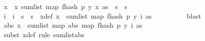 \begin{isabellebody}
\ {\isachardoublequoteopen}x\ {\isasymin}\ {\isacharparenleft}{\kern0pt}{\isasymlambda}x{\isachardot}{\kern0pt}\ sum{\isacharunderscore}{\kern0pt}list\ {\isacharparenleft}{\kern0pt}map\ {\isacharparenleft}{\kern0pt}f{}{\isacharunderscore}{\kern0pt}hash\ p\ {\isacharparenleft}{\kern0pt}y\ x{\isacharparenright}{\kern0pt}{\isacharparenright}{\kern0pt}\ as{\isacharparenright}{\kern0pt}{\isacharparenright}{\kern0pt}\ {\isacharbackquote}{\kern0pt}\ {\isacharparenleft}{\kern0pt}{\isacharbraceleft}{\kern0pt}{}{\isachardot}{\kern0pt}{\isachardot}{\kern0pt}{\isacharless}{\kern0pt}s\ {\isasymtimes}\ {\isacharbraceleft}{\kern0pt}{}{\isachardot}{\kern0pt}{\isachardot}{\kern0pt}{\isacharless}{\kern0pt}s\isanewline
\ \ \ \ \ \ \isamarkupfalse%
\ \isamarkupfalse%
\ i\ \ {\isachardoublequoteopen}i\ {\isasymin}\ {\isacharbraceleft}{\kern0pt}{}{\isachardot}{\kern0pt}{\isachardot}{\kern0pt}{\isacharless}{\kern0pt}s\ {\isasymtimes}\ {\isacharbraceleft}{\kern0pt}{}{\isachardot}{\kern0pt}{\isachardot}{\kern0pt}{\isacharless}{\kern0pt}s\ \ x{\isacharunderscore}{\kern0pt}def{\isacharcolon}{\kern0pt}\ {\isachardoublequoteopen}x\ {\isacharequal}{\kern0pt}\ sum{\isacharunderscore}{\kern0pt}list\ {\isacharparenleft}{\kern0pt}map\ {\isacharparenleft}{\kern0pt}f{}{\isacharunderscore}{\kern0pt}hash\ p\ {\isacharparenleft}{\kern0pt}y\ i{\isacharparenright}{\kern0pt}{\isacharparenright}{\kern0pt}\ as{\isacharparenright}{\kern0pt}{\isachardoublequoteclose}\isanewline
\ \ \ \ \ \ \ \ \isamarkupfalse%
\ blast\isanewline
\ \ \ \ \ \ \isamarkupfalse%
\ {\isachardoublequoteopen}abs\ x\ {\isasymle}\ sum{\isacharunderscore}{\kern0pt}list\ {\isacharparenleft}{\kern0pt}map\ abs\ {\isacharparenleft}{\kern0pt}map\ {\isacharparenleft}{\kern0pt}f{}{\isacharunderscore}{\kern0pt}hash\ p\ {\isacharparenleft}{\kern0pt}y\ i{\isacharparenright}{\kern0pt}{\isacharparenright}{\kern0pt}\ as{\isacharparenright}{\kern0pt}{\isacharparenright}{\kern0pt}{\isachardoublequoteclose}\isanewline
\ \ \ \ \ \ \ \ \isamarkupfalse%
\ {\isacharparenleft}{\kern0pt}subst\ x{\isacharunderscore}{\kern0pt}def{\isacharcomma}{\kern0pt}\ rule\ sum{\isacharunderscore}{\kern0pt}list{\isacharunderscore}{\kern0pt}abs{\isacharparenright}{\kern0pt}\isanewline

\end{isabellebody}
